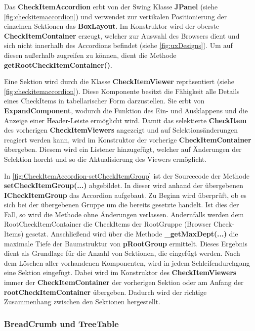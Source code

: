 Das \textbf{CheckItemAccordion} erbt von der Swing Klasse \textbf{JPanel} (siehe \autoref{fig:checkitemaccordion}) und verwendet zur vertikalen Positionierung der einzelnen Sektionen das \textbf{BoxLayout}. Im Konstruktor wird der oberste \textbf{CheckItemContainer} erzeugt, welcher zur Auswahl des Browsers dient und sich nicht innerhalb des Accordions befindet (siehe \autoref{fig:uxDesigns}). Um auf diesen außerhalb zugreifen zu können, dient die Methode \textbf{getRootCheckItemContainer()}.

Eine Sektion wird durch die Klasse \textbf{CheckItemViewer} repräsentiert (siehe \autoref{fig:checkitemaccordion}). Diese Komponente besitzt die Fähigkeit alle Details eines CheckItems in tabellarischer Form darzustellen. Sie erbt von \textbf{ExpandComponent}, wodurch die Funktion des Ein- und Ausklappens und die Anzeige einer Header-Leiste ermöglicht wird. Damit das selektierte \textbf{CheckItem} des vorherigen \textbf{CheckItemViewers} angezeigt und auf Selektionsänderungen reagiert werden kann, wird im Konstruktor der vorherige \textbf{CheckItemContainer} übergeben. Diesem wird ein Listener hinzugefügt, welcher auf Änderungen der Selektion horcht und so die Aktualisierung des Viewers ermöglicht.



In \autoref{fig:CheckItemAccordion-setCheckItemGroup} ist der Sourcecode der Methode \textbf{setCheckItemGroup(...)} abgebildet. In dieser wird anhand der übergebenen \textbf{ICheckItemGroup} das Accordion aufgebaut. Zu Beginn wird überprüft, ob es sich bei der übergebenen Gruppe um die bereits gesetzte handelt. Ist dies der Fall, so wird die Methode ohne Änderungen verlassen. Andernfalls werden dem RootCheckItemContainer die CheckItems der RootGruppe (Browser Check-Items) gesetzt. Anschließend wird über die Methode \textbf{\_getMaxDept(...)} die maximale Tiefe der Baumstruktur von \textbf{pRootGroup} ermittelt. Dieses Ergebnis dient als Grundlage für die Anzahl von Sektionen, die eingefügt werden. Nach dem Löschen aller vorhandenen Komponenten, wird in jedem Schleifendurchgang eine Sektion eingefügt. Dabei wird im Konstruktor des \textbf{CheckItemViewers} immer der \textbf{CheckItemContainer} der vorherigen Sektion oder am Anfang der \textbf{rootCheckItemContainer} übergeben. Dadurch wird der richtige Zusammenhang zwischen den Sektionen hergestellt.

\subsubsection{BreadCrumb und TreeTable}

